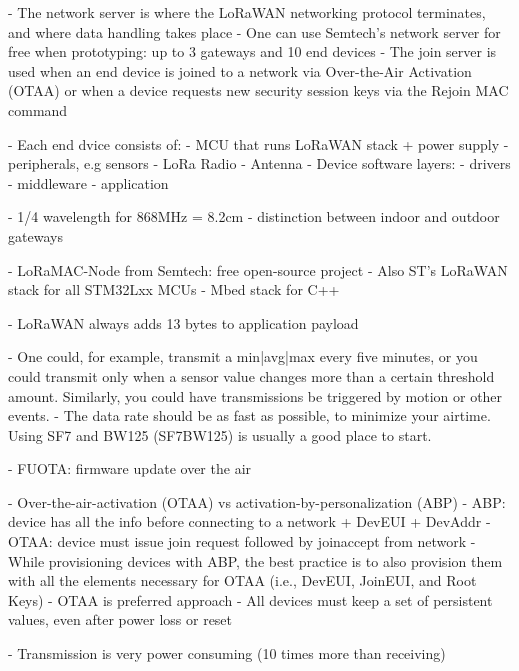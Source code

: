 - The network server is where the LoRaWAN networking protocol terminates, and where data handling takes place
- One can use Semtech's network server for free when prototyping: up to 3 gateways and 10 end devices 
- The join server is used when an end device is joined to a network via Over-the-Air Activation (OTAA) or when a device requests 
  new security session keys via the Rejoin MAC command

- Each end dvice consists of:
    - MCU that runs LoRaWAN stack + power supply
    - peripherals, e.g sensors
    - LoRa Radio
    - Antenna
- Device software layers:
    - drivers
    - middleware
    - application 

- 1/4 wavelength for 868MHz = 8.2cm
- distinction between indoor and outdoor gateways

- LoRaMAC-Node from Semtech: free open-source project
- Also ST's LoRaWAN stack for all STM32Lxx MCUs
- Mbed stack for C++

- LoRaWAN always adds 13 bytes to application payload

- One could, for example, transmit a min|avg|max every five minutes, or you could transmit only when a sensor value changes more than a certain threshold amount. 
  Similarly, you could have transmissions be triggered by motion or other events.
- The data rate should be as fast as possible, to minimize your airtime. 
  Using SF7 and BW125 (SF7BW125) is usually a good place to start.

- FUOTA: firmware update over the air

- Over-the-air-activation (OTAA) vs activation-by-personalization (ABP)
- ABP: device has all the info before connecting to a network + DevEUI + DevAddr
- OTAA: device must issue join request followed by joinaccept from network
- While provisioning devices with ABP, the best practice is to also provision 
  them with all the elements necessary for OTAA (i.e., DevEUI, JoinEUI, and Root Keys)
- OTAA is preferred approach
- All devices must keep a set of persistent values, even after power loss or reset

- Transmission is very power consuming (10 times more than receiving)

